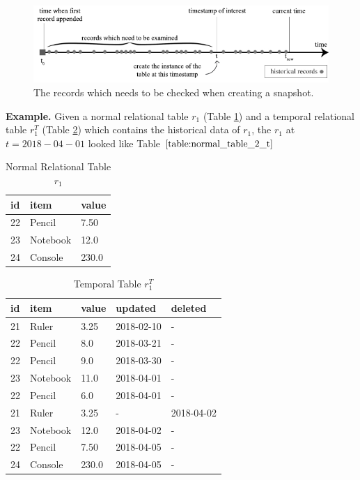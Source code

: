 \begin{figure}[b]
	\label{fig:checked_records}
	\centering
	\includegraphics[width=\textwidth]{figs/tobechecked_records.pdf}
	\caption{The records which needs to be checked when creating a snapshot.}
\end{figure}

\textbf{Example.} Given a normal relational table $r_1$ (Table \ref{table:normal_table_2}) and a temporal relational table $r_1^T$ (Table \ref{table:temporal_table_2}) which contains the historical data of $r_1$, the $r_1$ at $t=2018-04-01$ looked like Table $\ref{table:normal_table_2_t}$
\begin{center}

\begin{table}[t]
	\centering
	\caption{Normal Relational Table $r_1$}
	\label{table:normal_table_2}
	\begin{tabular}{p{4cm}p{4cm}p{4cm}}
		\hline
		id & item      & value  \\ \hline
		22 & Pencil    & 7.50 \\
		23 & Notebook & 12.0   \\ 
		24 & Console & 230.0 \\ \hline
	\end{tabular}
\end{table}

\begin{table}[t]
	\centering
	\caption{Temporal Table $r_1^T$}
	\label {table:temporal_table_2}
	\begin{tabular}{p{1cm}p{2cm}p{3cm}p{3cm}p{2cm}}
		\hline
		id & item      & value  & updated  & deleted\\ \hline
		21 & Ruler    & 3.25  & 2018-02-10  &  - \\  
		22 & Pencil    & 8.0  & 2018-03-21  &  - \\
		22 & Pencil    & 9.0  & 2018-03-30  &  -\\
		23 & Notebook & 11.0  & 2018-04-01 & - \\
		22 & Pencil & 6.0  & 2018-04-01 & - \\
		21 & Ruler    & 3.25  & -  &  2018-04-02 \\
		23 & Notebook & 12.0  & 2018-04-02 & - \\ 
		22 & Pencil & 7.50  & 2018-04-05 & - \\ 
		24 & Console & 230.0  & 2018-04-05 & - \\ \hline
	\end{tabular}
\end{table}
\end{center}
